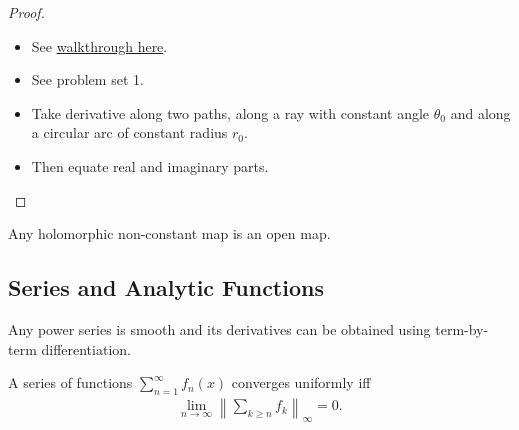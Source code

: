 \begin{proof}

\hfill

\begin{concept}

\hfill

\begin{itemize}
\tightlist
\item
  See
  \href{https://users.math.msu.edu/users/shapiro/Teaching/classes/425/crpolar.pdf}{walkthrough
  here}.
\item
  See problem set 1.
\end{itemize}

\end{concept}

\begin{itemize}
\tightlist
\item
  Take derivative along two paths, along a ray with constant angle
  \(\theta_0\) and along a circular arc of constant radius \(r_0\).
\item
  Then equate real and imaginary parts.
\end{itemize}

\end{proof}

\begin{theorem}

Any holomorphic non-constant map is an open map.

\end{theorem}

\hypertarget{series-and-analytic-functions}{%
\subsection{Series and Analytic
Functions}\label{series-and-analytic-functions}}

\begin{proposition}

Any power series is smooth and its derivatives can be obtained using
term-by-term differentiation.

\end{proposition}

\begin{proposition}

A series of functions \(\sum_{n=1}^\infty f_n(x)\) converges uniformly
iff
\begin{align*}  
\lim_{n\to \infty} {\left\lVert { \sum_{k\geq n} f_k } \right\rVert}_\infty = 0
.\end{align*}

\end{proposition}

